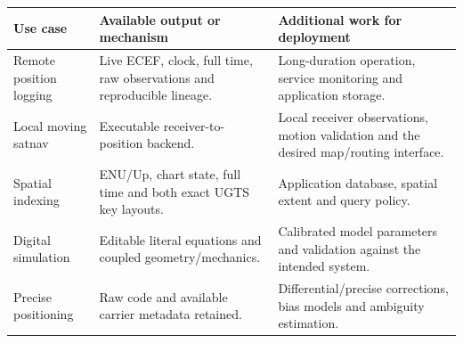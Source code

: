 \begin{center}
\begin{tabularx}{\textwidth}{@{}P{.28\textwidth}YY@{}}\toprule
\textbf{Use case} & \textbf{Available output or mechanism} & \textbf{Additional work for deployment}\\\midrule
Remote position logging & Live ECEF, clock, full time, raw observations and reproducible lineage. & Long-duration operation, service monitoring and application storage.\\
Local moving satnav & Executable receiver-to-position backend. & Local receiver observations, motion validation and the desired map/routing interface.\\
Spatial indexing & ENU/Up, chart state, full time and both exact UGTS key layouts. & Application database, spatial extent and query policy.\\
Digital simulation & Editable literal equations and coupled geometry/mechanics. & Calibrated model parameters and validation against the intended system.\\
Precise positioning & Raw code and available carrier metadata retained. & Differential/precise corrections, bias models and ambiguity estimation.\\\bottomrule
\end{tabularx}
\end{center}
\clearpage
